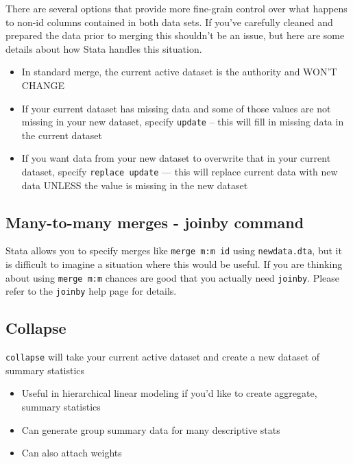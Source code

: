 \documentclass[
]{book}
\providecommand{\tightlist}{%
  \setlength{\itemsep}{0pt}\setlength{\parskip}{0pt}}
\begin{document}
There are several options that provide more fine-grain control over what happens to non-id columns contained in both data sets. If you've carefully cleaned and prepared the data prior to merging this shouldn't be an issue, but here are some details about how Stata handles this situation.

\begin{itemize}
\tightlist
\item
  In standard merge, the current active dataset is the authority and WON'T CHANGE
\item
  If your current dataset has missing data and some of those values are not missing in your new dataset, specify \texttt{update} -- this will fill in missing data in the current dataset
\item
  If you want data from your new dataset to overwrite that in your current dataset, specify \texttt{replace\ update} --- this will replace current data with new data UNLESS the value is missing in the new dataset
\end{itemize}

\hypertarget{many-to-many-merges---joinby-command}{%
\subsection{Many-to-many merges - joinby command}\label{many-to-many-merges---joinby-command}}

Stata allows you to specify merges like \texttt{merge\ m:m\ id} using \texttt{newdata.dta}, but it is difficult to imagine a situation where this would be useful. If you are thinking about using \texttt{merge\ m:m} chances are good that you actually need \texttt{joinby}. Please refer to the \texttt{joinby} help page for details.

\hypertarget{collapse}{%
\subsection{Collapse}\label{collapse}}

\texttt{collapse} will take your current active dataset and create a new dataset of summary statistics

\begin{itemize}
\tightlist
\item
  Useful in hierarchical linear modeling if you'd like to create aggregate, summary statistics
\item
  Can generate group summary data for many descriptive stats
\item
  Can also attach weights
\end{itemize}
\end{document}
